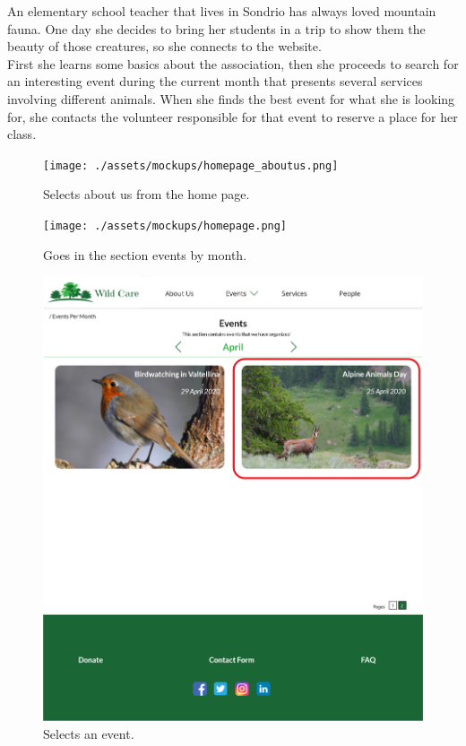 An elementary school teacher that lives in Sondrio has always loved mountain fauna. One day she decides to bring her students in a trip to show them the beauty of those creatures, so she connects to the website.\\
First she learns some basics about the association, then she proceeds to search for an interesting event during the current month that presents several services involving different animals. When she finds the best event for what she is looking for, she contacts the volunteer responsible for that event to reserve a place for her class.
	\begin{figure}[h!]
		\centering
		\begin{minipage}[b]{1\textwidth}
    			\texttt{[image: ./assets/mockups/homepage\_aboutus.png]}
			\caption{Selects about us from the home page.}
		\end{minipage}
	\end{figure}

	\begin{figure}[h!]
		\centering
		\begin{minipage}[b]{1\textwidth}
    			\texttt{[image: ./assets/mockups/homepage.png]}
			\caption{Goes in the section events by month.}
		\end{minipage}
	\end{figure}

	\begin{figure}[h!]
		\centering
		\begin{minipage}[b]{1\textwidth}
    			\includegraphics[width=\textwidth]{./assets/mockups/eventsbymonth_event.png}
			\caption{Selects an event.}
		\end{minipage}
	\end{figure}

